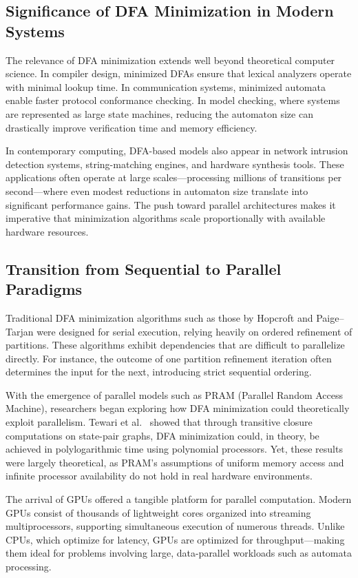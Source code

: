 \subsection{Significance of DFA Minimization in Modern Systems}

The relevance of DFA minimization extends well beyond theoretical computer science. In compiler design, minimized DFAs ensure that lexical analyzers operate with minimal lookup time. In communication systems, minimized automata enable faster protocol conformance checking. In model checking, where systems are represented as large state machines, reducing the automaton size can drastically improve verification time and memory efficiency.

In contemporary computing, DFA-based models also appear in network intrusion detection systems, string-matching engines, and hardware synthesis tools. These applications often operate at large scales—processing millions of transitions per second—where even modest reductions in automaton size translate into significant performance gains. The push toward parallel architectures makes it imperative that minimization algorithms scale proportionally with available hardware resources.

\subsection{Transition from Sequential to Parallel Paradigms}

Traditional DFA minimization algorithms such as those by Hopcroft and Paige–Tarjan were designed for serial execution, relying heavily on ordered refinement of partitions. These algorithms exhibit dependencies that are difficult to parallelize directly. For instance, the outcome of one partition refinement iteration often determines the input for the next, introducing strict sequential ordering.

With the emergence of parallel models such as PRAM (Parallel Random Access Machine), researchers began exploring how DFA minimization could theoretically exploit parallelism. Tewari et al.~\cite{tewari2002} showed that through transitive closure computations on state-pair graphs, DFA minimization could, in theory, be achieved in polylogarithmic time using polynomial processors. Yet, these results were largely theoretical, as PRAM’s assumptions of uniform memory access and infinite processor availability do not hold in real hardware environments.

The arrival of GPUs offered a tangible platform for parallel computation. Modern GPUs consist of thousands of lightweight cores organized into streaming multiprocessors, supporting simultaneous execution of numerous threads. Unlike CPUs, which optimize for latency, GPUs are optimized for throughput—making them ideal for problems involving large, data-parallel workloads such as automata processing.

